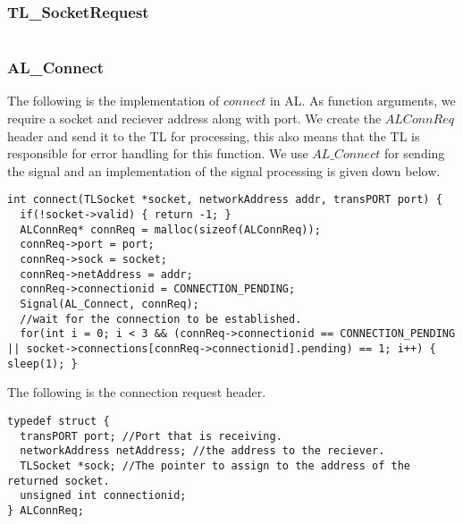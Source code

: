 \subsubsection{TL\_SocketRequest}
\begin{lstlisting}
\end{lstlisting}

\subsubsection{AL\_Connect}
The following is the implementation of $connect$ in AL.
As function arguments, we require a socket and reciever address along with port.
We create the $ALConnReq$ header and send it to the TL for processing,
this also means that the TL is responsible for error handling for this function.
We use $AL\_Connect$ for sending the signal and an implementation of the signal processing is given down below.
\begin{lstlisting}
int connect(TLSocket *socket, networkAddress addr, transPORT port) {
  if(!socket->valid) { return -1; }
  ALConnReq* connReq = malloc(sizeof(ALConnReq));
  connReq->port = port;
  connReq->sock = socket;
  connReq->netAddress = addr;
  connReq->connectionid = CONNECTION_PENDING;
  Signal(AL_Connect, connReq);
  //wait for the connection to be established.
  for(int i = 0; i < 3 && (connReq->connectionid == CONNECTION_PENDING || socket->connections[connReq->connectionid].pending) == 1; i++) { sleep(1); }
\end{lstlisting}

The following is the connection request header.
\begin{lstlisting}
typedef struct {
  transPORT port; //Port that is receiving.
  networkAddress netAddress; //the address to the reciever.
  TLSocket *sock; //The pointer to assign to the address of the returned socket.
  unsigned int connectionid;
} ALConnReq;
\end{lstlisting}

